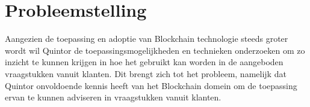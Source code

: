 \newpage
\chapter{Probleemstelling}

Aangezien de toepassing en adoptie van Blockchain technologie steeds groter wordt wil Quintor de toepassingsmogelijkheden en technieken onderzoeken om zo inzicht te kunnen krijgen in hoe het gebruikt kan worden in de aangeboden vraagstukken vanuit klanten. Dit brengt zich tot het probleem, namelijk dat Quintor onvoldoende kennis heeft van het Blockchain domein om de toepassing ervan te kunnen adviseren in vraagstukken vanuit klanten.
